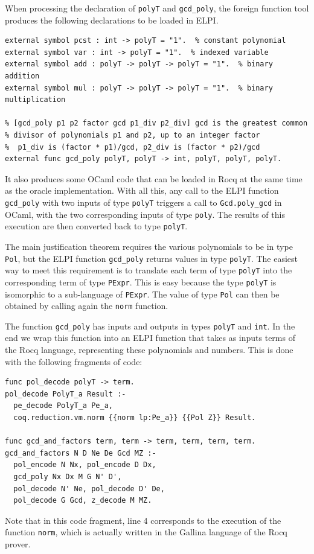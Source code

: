 \documentclass{jflart}
\begin{document}
When processing the declaration of \texttt{polyT} and \texttt{gcd\_poly}, the
foreign function tool produces the following declarations to be loaded
in ELPI.
\begin{lstlisting}
external symbol pcst : int -> polyT = "1".  % constant polynomial
external symbol var : int -> polyT = "1".  % indexed variable
external symbol add : polyT -> polyT -> polyT = "1".  % binary addition
external symbol mul : polyT -> polyT -> polyT = "1".  % binary multiplication

% [gcd_poly p1 p2 factor gcd p1_div p2_div] gcd is the greatest common
% divisor of polynomials p1 and p2, up to an integer factor 
%  p1_div is (factor * p1)/gcd, p2_div is (factor * p2)/gcd
external func gcd_poly polyT, polyT -> int, polyT, polyT, polyT.
\end{lstlisting}
It also produces some OCaml code that can be loaded in Rocq at the same time
as the oracle implementation.  With all this, any call to the ELPI
function \texttt{gcd\_poly} with two inputs of type \texttt{polyT} triggers
a call to \texttt{Gcd.poly\_gcd} in OCaml, with the two corresponding inputs
of type \texttt{poly}.  The results of this execution are then converted back
to type \texttt{polyT}.

The main justification theorem requires the various polynomials to be in
type \texttt{Pol}, but the ELPI function \texttt{gcd\_poly} returns values in
type \texttt{polyT}.  The easiest way to meet this requirement is to translate each term of type \texttt{polyT} into the corresponding term of type \texttt{PExpr}.  This
is easy because the type \texttt{polyT} is isomorphic to a sub-language of
\texttt{PExpr}.  The value of type \texttt{Pol} can then be obtained by calling
again the \texttt{norm} function.

The function \texttt{gcd\_poly} has inputs and outputs in types \texttt{polyT} and
\texttt{int}.  In the end we wrap this function into an ELPI function that takes
as inputs terms of the Rocq language, representing these polynomials and
numbers.  This is done with the following fragments of code:

\begin{lstlisting}
func pol_decode polyT -> term.
pol_decode PolyT_a Result :-
  pe_decode PolyT_a Pe_a,
  coq.reduction.vm.norm {{norm lp:Pe_a}} {{Pol Z}} Result.

func gcd_and_factors term, term -> term, term, term, term.
gcd_and_factors N D Ne De Gcd MZ :-
  pol_encode N Nx, pol_encode D Dx,
  gcd_poly Nx Dx M G N' D',
  pol_decode N' Ne, pol_decode D' De,
  pol_decode G Gcd, z_decode M MZ.
\end{lstlisting}
Note that in this code fragment, line 4 corresponds to the execution
of the function \texttt{norm}, which is actually written in the Gallina
language of the Rocq prover.
\end{document}
